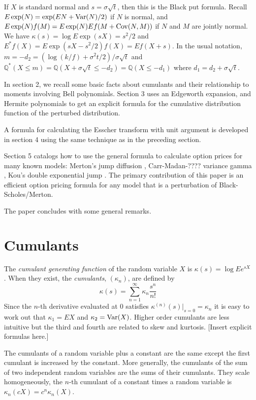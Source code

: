 \documentclass[12pt]{article}
\newcommand{\Var}{\mathop{\rm{Var}}}
\newcommand{\Cov}{\mathop{\rm{Cov}}}
\theoremstyle{definition}
\begin{document}
If \(X\) is standard normal and \(s = \sigma\sqrt{t}\),
then this is the Black\cite{Bla1976} put formula. Recall
\(
E\exp(N) = \exp(E N + \Var(N)/2)
\) 
if \(N\) is
normal, and 
\(
E \exp(N) f(M) = E\exp(N) Ef(M + \Cov(N,M))
\)
if \(N\) and \(M\) are jointly normal. We have
\(\kappa(s) = \log E \exp(sX) = s^2/2 \) and
\(E^* f(X) = E \exp(sX-s^2/2) f(X)
= E f(X + s)\). In the usual notation,
\(m = -d_2 = (\log (k/f) + \sigma^2t/2)/\sigma\sqrt{t} \)
and \(\mathbb{Q}^*(X \le m) = \mathbb{Q} (X + \sigma\sqrt{t} \le -d_2)
= \mathbb{Q}(X \le -d_1)\) where \(d_1 = d_2 + \sigma\sqrt{t}\).

In section 2, we recall some basic facts about cumulants and their
relationship to moments involving Bell polynomials.  Section 3 uses an
Edgeworth expansion, and Hermite polynomials to get an explicit formula
for the cumulative distribution function of the perturbed distribution.

A formula for calculating the Esscher transform with unit argument is
developed in section 4 using the same technique as in the preceding
section.

Section 5 catalogs how to use the general formula to calculate
option prices for many known models: Merton's jump diffusion \cite{},
Carr-Madan-???? variance gamma \cite{}, Kou's double exponential jump
\cite{}.
The primary contribution of this paper is an efficient option
pricing formula for any model that is a perturbation of
Black-Scholes/Merton.

The paper concludes with some general remarks.

\section{Cumulants}

The {\em cumulant generating function} of the random variable \(X\)
is \(\kappa(s) = \log Ee^{sX}\).
When they exist, the {\em cumulants}, \((\kappa_n)\),
are defined by
\[
\kappa(s) = \sum_{n=1}^\infty \kappa_n \frac{s^n}{n!}
\]
Since the \(n\)-th derivative evaluated at \(0\)
satisfies \(\kappa^{(n)}(s)|_{s = 0} = \kappa_n\) 
it is easy to
work out that
\(\kappa_1 = EX\) and \(\kappa_2 = \Var(X)\). Higher order
cumulants are less intuitive but the third and fourth are
related to skew and kurtosis. [Insert explicit formulas here.]


The cumulants of a random variable plus a constant are the 
same except the first cumulant is increased by the constant.
More generally, the cumulants of the sum of two independent 
random variables are the sums of their cumulants.
They scale homogeneously, the \(n\)-th cumulant of a constant
times a random variable is
\(\kappa_n(cX) = c^n\kappa_n(X)\).
\end{document}
